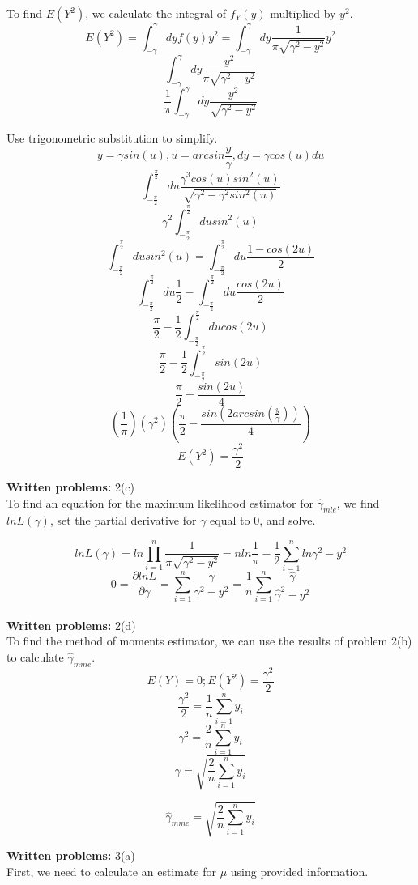 \documentclass [12pt] {article}
\begin{document}
To find $E(Y^2)$, we calculate the integral of $f_Y(y)$ multiplied by $y^2$.
\[ E(Y^2) = \int_{-\gamma}^{\gamma} dyf(y)y^2 = \int_{-\gamma}^{\gamma}dy\frac{1}{\pi\sqrt{\gamma^2-y^2}}y ^2\]
\[ \int_{-\gamma}^{\gamma}dy\frac{y^2}{\pi\sqrt{\gamma^2-y^2}}\]
\[ \frac{1}{\pi} \int_{-\gamma}^{\gamma}dy\frac{y^2}{\sqrt{\gamma^2-y^2}}\]

Use trigonometric substitution to simplify.
\[ y = \gamma sin(u), u = arcsin\frac{y}{\gamma}, dy = \gamma cos(u)du\]
\[\int_{-\frac{\pi}{2}}^{\frac{\pi}{2}}du\frac{\gamma^3cos(u)sin^2(u)}{\sqrt{\gamma^2-\gamma^2sin^2(u)}}\]
\[\gamma^2\int_{-\frac{\pi}{2}}^{\frac{\pi}{2}}du sin^2(u) \]
\[ \int_{-\frac{\pi}{2}}^{\frac{\pi}{2}}du sin^2(u) = \int_{-\frac{\pi}{2}}^{\frac{\pi}{2}}du\frac{1-cos(2u)}{2} \]
\[ \int_{-\frac{\pi}{2}}^{\frac{\pi}{2}}du\frac{1}{2}- \int_{-\frac{\pi}{2}}^{\frac{\pi}{2}}du\frac{cos(2u)}{2} \]
\[ \frac{\pi}{2} - \frac{1}{2}\int_{-\frac{\pi}{2}}^{\frac{\pi}{2}}ducos(2u) \]
\[ \frac{\pi}{2} - \frac{1}{2}\int_{-\frac{\pi}{2}}^{\frac{\pi}{2}}sin(2u) \]
\[ \frac{\pi}{2} - \frac{sin(2u)}{4} \]
\[ (\frac{1}{\pi})(\gamma^2)(\frac{\pi}{2} -\frac{sin(2arcsin(\frac{y}{\gamma}))}{4}) \]
\[ E(Y^2) = \frac{\gamma^2}{2} \]


\noindent \textbf{Written problems:} 2(c)\\
To find an equation for the maximum likelihood estimator for $\hat{\gamma}_{mle}$, we find $lnL(\gamma)$, set the partial derivative for $\gamma$ equal to 0, and solve.

\[ lnL(\gamma) = ln\prod_{i=1}^{n}\frac{1}{\pi\sqrt{\gamma^2-y^2}} = nln\frac{1}{\pi} - \frac{1}{2}\sum_{i=1}^{n}ln\gamma^2-y^2 \] 
\[ 0 = \frac{\partial lnL}{\partial \gamma} = \sum_{i=1}^{n}\frac{\gamma}{\gamma^2-y^2} = \frac{1}{n}\sum_{i=1}^{n}\frac{\hat{\gamma}}{\hat{\gamma}^2-y^2} \]
\\
\noindent \textbf{Written problems:} 2(d)\\
To find the method of moments estimator, we can use the results of problem 2(b) to calculate $\hat{\gamma}_{mme}$.
\[ E(Y) = 0; E(Y^2) = \frac{\gamma^2}{2} \]
\[ \frac{\gamma^2}{2} = \frac{1}{n}\sum_{i=1}^{n}y_i \]
\[ \gamma^2 = \frac{2}{n}\sum_{i=1}^{n}y_i  \]
\[ \gamma = \sqrt{\frac{2}{n}\sum_{i=1}^{n}y_i}  \]


\[ \hat{\gamma}_{mme} = \sqrt{\frac{2}{n}\sum_{i=1}^{n}y_i} \]

\noindent \textbf{Written problems:} 3(a)\\
First, we need to calculate an estimate for $\mu$ using provided information.
\end{document}
